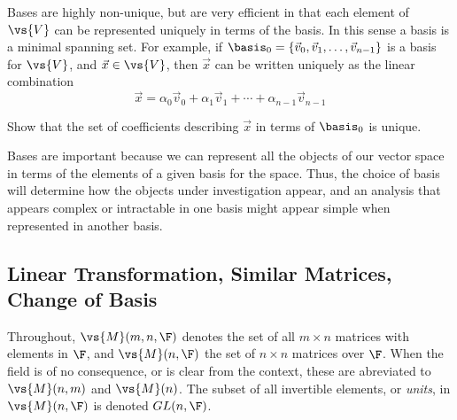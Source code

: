 Bases are highly non-unique, but are very efficient in that each
element of $\vs{V}$ can be represented uniquely in terms of the
basis.  In this sense a basis is a minimal spanning set.  For example, if 
$\basis_0 = \{\vec{v}_0, \vec{v}_1, \ldots, \vec{v}_{n-1}\}$ is a basis for $\vs{V}$,
and $\vec{x} \in \vs{V}$, then $\vec{x}$ can be written uniquely as the linear
combination %
\begin{equation}\label{eq:P-8}
\vec{x} = \alpha_0 \vec{v}_0 + \alpha_1 \vec{v}_1 + \cdots + \alpha_{n-1} \vec{v}_{n-1}
\end{equation}
\begin{exercise}
Show that the set of coefficients describing $\vec{x}$ in terms of $\basis_0$ is unique.
\end{exercise}

Bases are important because we can represent all the objects of our
vector space in terms of the elements of a given basis for the space.
Thus, the choice of basis will determine how the objects under
investigation appear, and an analysis that appears complex or intractable in
one basis might appear simple when represented in another basis.


\subsection{Linear Transformation, Similar Matrices, Change of Basis}
Throughout, $\vs{M}(m,n,\F)$ denotes the set of all $m\times n$ matrices with
elements in $\F$, and $\vs{M}(n, \F)$ the set of $n\times n$ matrices over $\F$.
When the field is of no consequence, or is clear from the context, these are
abreviated to $\vs{M}(n, m)$ and $\vs{M}(n)$.  The subset of all invertible
elements, or \emph{units}, in $\vs{M}(n, \F)$ is denoted $GL(n, \F)$.

